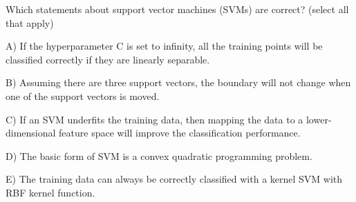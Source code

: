 Which statements about support vector machines (SVMs) are correct? (select all that apply)


A) If the hyperparameter C is set to infinity, all the training points will be classified correctly if they are linearly separable.


B) Assuming there are three support vectors, the boundary will not change when one of the support vectors is moved.


C) If an SVM underfits the training data, then mapping the data to a lower-dimensional feature space will improve the classification performance.


D) The basic form of SVM is a convex quadratic programming problem.


E) The training data can always be correctly classified with a kernel SVM with RBF kernel function.
